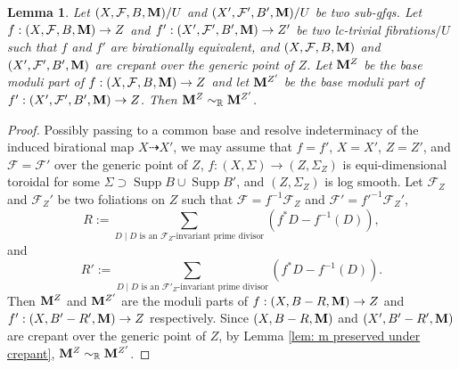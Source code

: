 \documentclass[11pt]{amsart}
\numberwithin{equation}{section}
\newcommand{\Mm}{{\bf{M}}}
\newcommand{\Supp}{\operatorname{Supp}}
\newcommand{\Ff}{\mathcal{F}}
\newtheorem{lem}[thm]{Lemma}
\theoremstyle{definition}
\theoremstyle{definition}
\theoremstyle{definition}
\begin{document}
\begin{lem}\label{lem: m preserved under crepant gfq}
Let $(X,\Ff,B,\Mm)/U$ and $(X',\Ff',B',\Mm)/U$ be two sub-gfqs. Let $f: (X,\Ff,B,\Mm)\rightarrow Z$ and $f': (X',\Ff',B',\Mm)\rightarrow Z'$ be two lc-trivial fibrations$/U$ such that $f$ and $f'$ are birationally equivalent, and $(X,\Ff,B,\Mm)$ and $(X',\Ff',B',\Mm)$ are crepant over the generic point of $Z$. Let $\Mm^Z$ be the base moduli part of $f: (X,\Ff,B,\Mm)\rightarrow Z$  and let $\Mm^{Z'}$ be the base moduli part of $f': (X',\Ff',B',\Mm)\rightarrow Z$. Then $\Mm^Z\sim_{\mathbb R}\Mm^{Z'}$.
\end{lem}
\begin{proof}
Possibly passing to a common base and resolve indeterminacy of the induced birational map $X\dashrightarrow X'$, we may assume that $f=f'$, $X=X'$, $Z=Z'$, and $\Ff=\Ff'$ over the generic point of $Z$, $f: (X,\Sigma)\rightarrow (Z,\Sigma_Z)$ is equi-dimensional toroidal for some $\Sigma\supset\Supp B\cup\Supp B'$, and $(Z,\Sigma_Z)$ is log smooth. Let $\Ff_Z$ and $\Ff_Z'$ be two foliations on $Z$ such that $\Ff=f^{-1}\Ff_Z$ and $\Ff'=f'^{-1}\Ff_Z'$,
 $$R:=\sum_{D\mid D\text{ is an }\Ff_{Z}\text{-invariant prime divisor}}(f^*D-f^{-1}(D)),$$
 and
$$R':=\sum_{D\mid D\text{ is an }\Ff'_{Z}\text{-invariant prime divisor}}(f^*D-f^{-1}(D)).$$
Then $\Mm^Z$ and $\Mm^{Z'}$ are the moduli parts of $f: (X,B-R,\Mm)\rightarrow Z$ and $f': (X,B'-R',\Mm)\rightarrow Z$ respectively. Since $(X,B-R,\Mm)$ and $(X',B'-R',\Mm)$ are crepant over the generic point of $Z$, by Lemma \ref{lem: m preserved under crepant}, $\Mm^Z\sim_{\mathbb R}\Mm^{Z'}$.
\end{proof}
\end{document}
